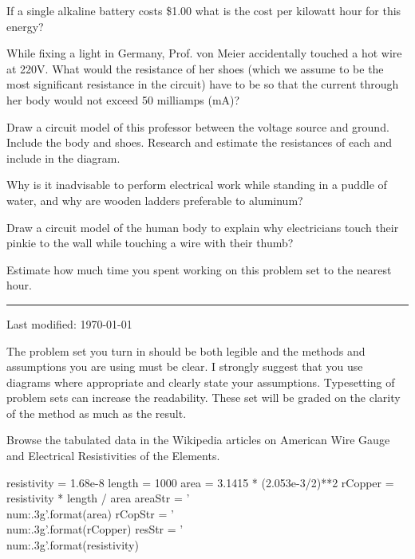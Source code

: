 \documentclass{article}
\begin{document}
\subproblem
If a single alkaline battery costs \$1.00 what is the cost per kilowatt
hour for this energy?



\subproblem
While fixing a light in Germany, Prof. von Meier accidentally
touched a hot wire at 220V.  What would the resistance of her shoes
(which we assume to be the most significant resistance in the
circuit) have to be so that the current through her body would not
exceed 50 milliamps (mA)?

\subproblem
Draw a circuit model of this professor between the voltage source and
ground.  Include the body and shoes.  Research and estimate the
resistances of each and include in the diagram.

\subproblem
Why is it inadvisable to perform electrical work while standing
in a puddle of water, and why are wooden ladders preferable to
aluminum?

\subproblem
Draw a circuit model of the human body to explain why electricians touch
their pinkie to the wall while touching a wire with their thumb?



Estimate how much time you spent working on this problem set to the
nearest hour.

\newpage
\setcounter{problem}{0}
\hrule
\vspace{10pt}

{\tiny Last modified: \today}

The problem set you turn in should be both legible and the methods and
assumptions you are using must be clear.  I strongly suggest that
you use diagrams where appropriate and clearly state your assumptions.
Typesetting of problem sets can increase the readability.  These set
will be graded on the clarity of the method as much as the result.



Browse the tabulated data in the Wikipedia articles on American Wire Gauge and
Electrical Resistivities of the Elements.


\begin{pycode}
resistivity = 1.68e-8
length = 1000
area = 3.1415 * (2.053e-3/2)**2
rCopper = resistivity * length / area
areaStr = '\\num{{{:.3g}}}'.format(area)
rCopStr = '\\num{{{:.3g}}}'.format(rCopper)
resStr = '\\num{{{:.3g}}}'.format(resistivity)
\end{pycode}
\end{document}
